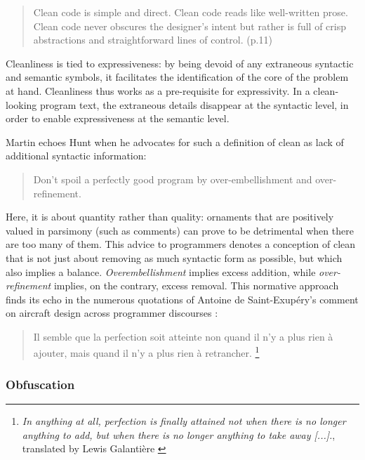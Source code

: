 \begin{quote}
  Clean code is simple and direct. Clean code reads like well-written prose. Clean code never obscures the designer's intent but rather is full of crisp abstractions and straightforward lines of control. \citep{martin_clean_2008} (p.11)
\end{quote}

Cleanliness is tied to expressiveness: by being devoid of any extraneous syntactic and semantic symbols, it facilitates the identification of the core of the problem at hand. Cleanliness thus works as a pre-requisite for expressivity. In a clean-looking program text, the extraneous details disappear at the syntactic level, in order to enable expressiveness at the semantic level.

Martin echoes Hunt when he advocates for such a definition of clean as lack of additional syntactic information:

\begin{quote}
  Don't spoil a perfectly good program by over-embellishment and over-refinement. \citep{hunt_pragmatic_1999}
\end{quote}

Here, it is about quantity rather than quality: ornaments that are positively valued in parsimony (such as comments) can prove to be detrimental when there are too many of them. This advice to programmers denotes a conception of clean that is not just about removing as much syntactic form as possible, but which also implies a balance. \emph{Overembellishment} implies excess addition, while \emph{over-refinement} implies, on the contrary, excess removal. This normative approach finds its echo in the numerous quotations of Antoine de Saint-Exupéry's comment on aircraft design across programmer discourses \citep{programmingwisdom[codewisdom]_designer_2021,jackson_perfection_2010,jargonfile4.4.7_elegant_2003}:

\begin{quote}
  Il semble que la perfection soit atteinte non quand il n'y a plus rien à ajouter, mais quand il n'y a plus rien à retrancher.  \citep{desaint-exupery_terre_1972}\footnote{\emph{ In anything at all, perfection is finally attained not when there is no longer anything to add, but when there is no longer anything to take away [...].}, translated by Lewis Galantière \citep{saint-exupery_wind_1990}}
\end{quote}

\subsubsection{Obfuscation}
\label{subsubsec:obfuscation}

